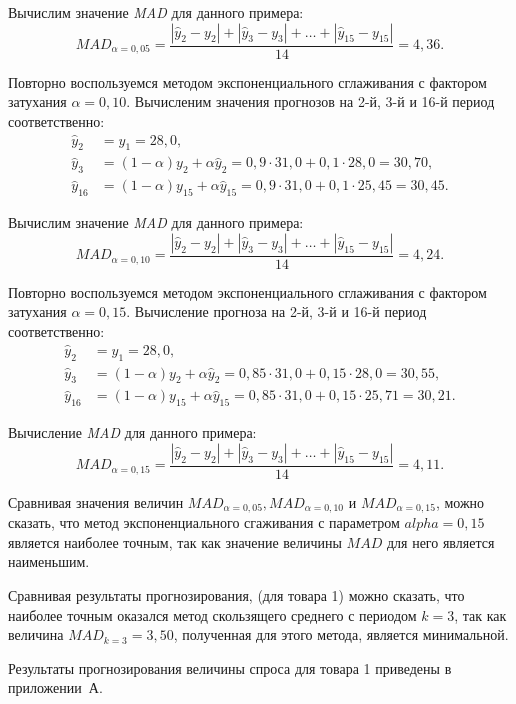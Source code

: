 Вычислим значение \textit{MAD} для данного примера:
\[
  MAD_{\alpha = 0{,}05} = \dfrac{|\hat{y}_2 - y_2| + |\hat{y}_3 - y_3| + \dots + |\hat{y}_{15} - y_{15}|}{14} = 4{,}36.
\]

Повторно воспользуемся методом экспоненциального сглаживания с фактором
затухания $\alpha=0{,}10$. Вычисленим значения прогнозов на 2-й, 3-й и 16-й период соответственно:
\begin{align*}
  \hat{y}_2 &= y_1 = 28{,}0, \\
  \hat{y}_3 &= (1 - \alpha) y_2 + \alpha \hat{y}_2 = 0{,}9 \cdot 31{,}0 + 0{,}1 \cdot 28{,}0 = 30{,}70, \\
  \hat{y}_{16} &= (1 - \alpha) y_{15} + \alpha \hat{y}_{15}  = 0{,}9 \cdot 31{,}0 + 0{,}1 \cdot 25{,}45 = 30{,}45.
\end{align*}

Вычислим значение \textit{MAD} для данного примера:
\[
  MAD_{\alpha = 0{,}10} = \dfrac{|\hat{y}_2 - y_2| + |\hat{y}_3 - y_3| + \dots + |\hat{y}_{15} - y_{15}|}{14} = 4{,}24.
\]

Повторно воспользуемся методом экспоненциального сглаживания с фактором
затухания $\alpha=0{,}15$. Вычисление прогноза на 2-й, 3-й и 16-й период соответственно:
\begin{align*}
  \hat{y}_2 &= y_1 = 28{,}0, \\
  \hat{y}_3 &= (1 - \alpha) y_2 + \alpha \hat{y}_2 = 0{,}85 \cdot 31{,}0 + 0{,}15 \cdot 28{,}0 = 30{,}55, \\
  \hat{y}_{16} &= (1 - \alpha) y_{15} + \alpha \hat{y}_{15}  = 0{,}85 \cdot 31{,}0 + 0{,}15 \cdot 25{,}71 = 30{,}21.
\end{align*}

Вычисление \textit{MAD} для данного примера:
\[
  MAD_{\alpha = 0{,}15} = \dfrac{|\hat{y}_2 - y_2| + |\hat{y}_3 - y_3| + \dots + |\hat{y}_{15} - y_{15}|}{14} = 4{,}11.
\]

Сравнивая значения величин $MAD_{\alpha = 0{,}05}, MAD_{\alpha = 0{,}10}$ и $MAD_{\alpha = 0{,}15}$,
можно сказать, что метод экспоненциального сгаживания с параметром $alpha = 0{,}15$
является наиболее точным, так как значение величины $MAD$ для него является наименьшим.

Сравнивая результаты прогнозирования, (для товара 1) можно сказать, что наиболее точным
оказался метод скользящего среднего с периодом $k = 3$, так как величина
$ MAD_{k=3} = 3{,}50$, полученная для этого метода, является минимальной.

Результаты прогнозирования величины спроса для товара 1 приведены в приложении~А.



